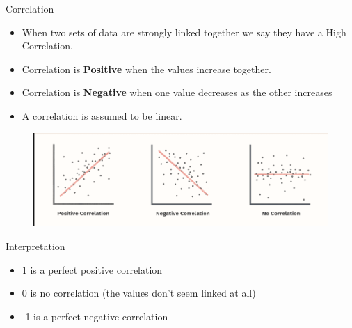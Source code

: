 \begin{frame}[t]{Correlation}
	\begin{itemize}
		\item When two sets of data are strongly linked together we say they 
		have a High Correlation.
		\item Correlation is \textbf{Positive} when the values increase 
		together.
		\item Correlation is \textbf{Negative} when one value decreases as the 
		other increases
		\item A correlation is assumed to be linear.	
	\end{itemize}

\begin{figure} [ht]
	\centering
	\includegraphics[trim={1cm 0cm 1cmcm 1cm}, clip, scale=0.4]{eda/corr}
\end{figure}
\end{frame}

\begin{frame}[t]{Interpretation}
	\begin{itemize}
		\item 1 is a perfect positive correlation
		\item 0 is no correlation (the values don't seem linked at all)
		\item -1 is a perfect negative correlation
	\end{itemize}
\end{frame}

